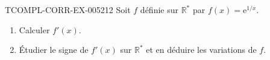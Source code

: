 \begin{exercice}{TCOMPL-CORR-EX-005}{2}{12}
Soit $f$ définie sur $\mathbb{R}^*$ par $f(x) = \mathrm{e}^{1/x}$.
\begin{enumerate}
  \item Calculer $f'(x)$.
  \item Étudier le signe de $f'(x)$ sur $\mathbb{R}^*$ et en déduire les variations de $f$.
\end{enumerate}

\end{exercice}
